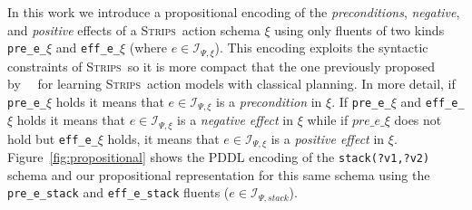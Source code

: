 \documentclass{article}
\newcommand{\strips}{\textsc{Strips}}
\begin{document}
In this work we introduce a propositional encoding of the {\em preconditions}, {\em negative}, and {\em positive} effects of a \strips\ action schema $\xi$ using only fluents of two kinds {\tt\small pre\_e\_$\xi$} and {\tt\small eff\_e\_$\xi$} (where $e\in{\mathcal I}_{\Psi,\xi}$). This encoding exploits the syntactic constraints of \strips\, so it is more compact that the one previously proposed by~\citeauthor{aineto2018learning}~\citeyear{aineto2018learning} for learning \strips\ action models with classical planning. In more detail, if {\tt\small pre\_e\_$\xi$} holds it means that $e\in{\mathcal I}_{\Psi,\xi}$ is a {\em precondition} in $\xi$. If {\tt\small pre\_e\_$\xi$} and {\tt\small eff\_e\_$\xi$} holds it means that $e\in{\mathcal I}_{\Psi,\xi}$ is a {\em negative effect} in $\xi$ while if $pre\_e\_\xi$ does not hold but {\tt\small eff\_e\_$\xi$} holds, it means that $e\in{\mathcal I}_{\Psi,\xi}$ is a {\em positive effect} in $\xi$. Figure~\ref{fig:propositional} shows the PDDL encoding of the {\tt\small stack(?v1,?v2)} schema and our propositional representation for this same schema using the {\tt\small pre\_e\_stack} and {\tt\small eff\_e\_stack} fluents ($e\in{\mathcal I}_{\Psi,stack}$).
\end{document}

